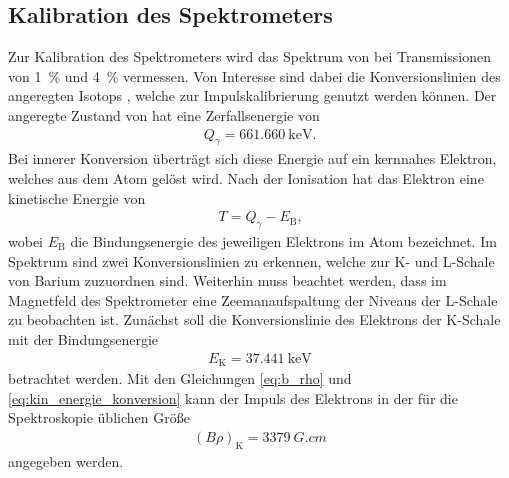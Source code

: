\documentclass[11pt, a4paper]{article}
\numberwithin{equation}{section}
\begin{document}
\subsection{Kalibration des Spektrometers}
Zur Kalibration des Spektrometers wird das Spektrum von  bei Transmissionen von \SI{1}{\percent} und \SI{4}{\percent} vermessen.
Von Interesse sind dabei die Konversionslinien des angeregten Isotops , welche zur Impulskalibrierung genutzt werden können.
Der angeregte Zustand von  hat eine Zerfallsenergie von
\begin{align*}
	Q_\gamma = \SI{661,660}{\kilo\electronvolt}\text{.}
\end{align*}
Bei innerer Konversion überträgt sich diese Energie auf ein kernnahes Elektron, welches aus dem Atom gelöst wird.
Nach der Ionisation hat das Elektron eine kinetische Energie von
\begin{align}
	T = Q_\gamma - E_\mathrm{B} \text{,}
	\label{eq:kin_energie_konversion}
\end{align}
wobei $E_\mathrm{B}$ die Bindungsenergie des jeweiligen Elektrons im Atom bezeichnet.
Im Spektrum sind zwei Konversionslinien zu erkennen, welche zur K- und L-Schale von Barium zuzuordnen sind.
Weiterhin muss beachtet werden, dass im Magnetfeld des Spektrometer eine Zeemanaufspaltung der Niveaus der L-Schale zu beobachten ist.
Zunächst soll die Konversionslinie des Elektrons der K-Schale mit der Bindungsenergie
\begin{align*}
E_\mathrm{K} = \SI{37,441}{\kilo\electronvolt}
\end{align*}
betrachtet werden.
Mit den Gleichungen \eqref{eq:b_rho} und \eqref{eq:kin_energie_konversion} kann der Impuls des Elektrons in der für die Spektroskopie üblichen Größe
\begin{align*}
	\left(B \rho \right)_\mathrm{K} = \SI{3379}{G.cm}
\end{align*}
angegeben werden.
\end{document}

